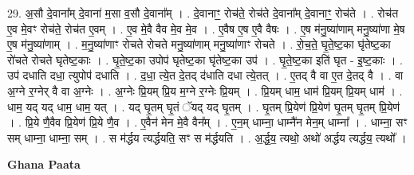 \documentclass[17pt]{extarticle}
\begin{document}
29. अ॒सौ दे॒वाना᳚म् दे॒वाना॑ म॒सा व॒सौ दे॒वाना᳚म् । . दे॒वानाꣳ॒॒ रोच॑ते॒ रोच॑ते दे॒वाना᳚म् दे॒वानाꣳ॒॒ रोच॑ते । . रोच॑त ए॒व मे॒वꣳ रोच॑ते॒ रोच॑त ए॒वम् । . ए॒व मे॒वै वैव मे॒व मे॒व । . ए॒वैष ए॒ष ए॒वै वैषः । . ए॒ष म॑नु॒ष्या॑णाम् मनु॒ष्या॑णा मे॒ष ए॒ष म॑नु॒ष्या॑णाम् । . म॒नु॒ष्या॑णाꣳ रोचते रोचते मनु॒ष्या॑णाम् मनु॒ष्या॑णाꣳ रोचते । . रो॒च॒ते॒ घृ॒ते॒ष्ट॒का घृ॑तेष्ट॒का रो॑चते रोचते घृतेष्ट॒काः । . घृ॒ते॒ष्ट॒का उपोप॑ घृतेष्ट॒का घृ॑तेष्ट॒का उप॑ । . घृ॒ते॒ष्ट॒का इति॑ घृत - इ॒ष्ट॒काः । . उप॑ दधाति दधा॒ त्युपोप॑ दधाति । . द॒धा॒ त्ये॒त दे॒तद् द॑धाति दधा त्ये॒तत् । . ए॒तद् वै वा ए॒त दे॒तद् वै । . वा अ॒ग्ने र॒ग्नेर् वै वा अ॒ग्नेः । . अ॒ग्नेः प्रि॒यम् प्रि॒य म॒ग्ने र॒ग्नेः प्रि॒यम् । . प्रि॒यम् धाम॒ धाम॑ प्रि॒यम् प्रि॒यम् धाम॑ । . धाम॒ यद् यद् धाम॒ धाम॒ यत् । . यद् घृ॒तम् घृ॒तं ॅयद् यद् घृ॒तम् । . घृ॒तम् प्रि॒येण॑ प्रि॒येण॑ घृ॒तम् घृ॒तम् प्रि॒येण॑ । . प्रि॒ये णै॒वैव प्रि॒येण॑ प्रि॒ये णै॒व । . ए॒वैन॑ मेन मे॒वै वैन᳚म् । . ए॒न॒म् धाम्ना॒ धाम्नै॑न मेन॒म् धाम्ना᳚ । . धाम्ना॒ सꣳ सम् धाम्ना॒ धाम्ना॒ सम् । . स म॑र्द्धय त्यर्द्धयति॒ सꣳ स म॑र्द्धयति । . अ॒र्द्ध॒य॒ त्यथो॒ अथो॑ अर्द्धय त्यर्द्धय॒ त्यथो᳚ । \newline

\textbf{Ghana Paata } \newline
\end{document}
